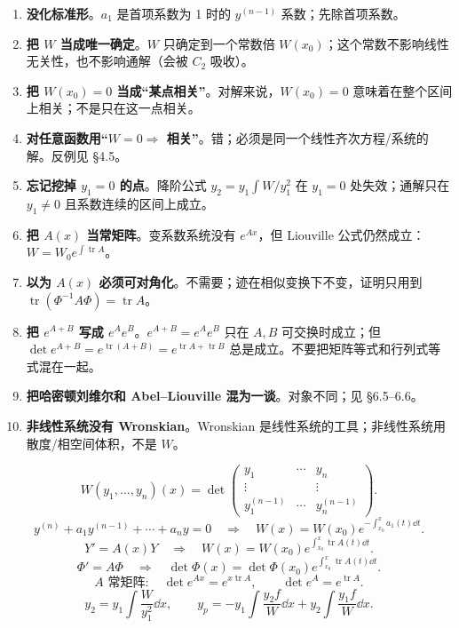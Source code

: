 \documentclass[11pt]{ctexart}
\let\orighdr\hdr
\renewcommand{\hdr}[2]{\needspace{12\baselineskip}\orighdr{#1}{#2}}
\let\origsubhdr\subhdr
\renewcommand{\subhdr}[1]{\needspace{3\baselineskip}\origsubhdr{#1}}
\newcommand{\tr}{\operatorname{tr}}
\begin{document}
\begin{enumerate}
  \item \textbf{没化标准形}。$a_1$ 是首项系数为 1 时的 $y^{(n-1)}$ 系数；先除首项系数。
  \item \textbf{把 $W$ 当成唯一确定}。$W$ 只确定到一个常数倍 $W(x_0)$；这个常数不影响线性无关性，也不影响通解（会被 $C_2$ 吸收）。
  \item \textbf{把 $W(x_0)=0$ 当成“某点相关”}。对解来说，$W(x_0)=0$ 意味着在整个区间上相关；不是只在这一点相关。
  \item \textbf{对任意函数用“$W=0\Rightarrow$ 相关”}。错；必须是同一个线性齐次方程/系统的解。反例见 §4.5。
  \item \textbf{忘记挖掉 $y_1=0$ 的点}。降阶公式 $y_2=y_1\int W/y_1^2$ 在 $y_1=0$ 处失效；通解只在 $y_1\neq0$ 且系数连续的区间上成立。
  \item \textbf{把 $A(x)$ 当常矩阵}。变系数系统没有 $e^{Ax}$，但 Liouville 公式仍然成立：$W=W_0e^{\int\tr A}$。
  \item \textbf{以为 $A(x)$ 必须可对角化}。不需要；迹在相似变换下不变，证明只用到 $\tr(\Phi^{-1}A\Phi)=\tr A$。
  \item \textbf{把 $e^{A+B}$ 写成 $e^A e^B$}。$e^{A+B}=e^A e^B$ 只在 $A,B$ 可交换时成立；但 $\det e^{A+B}=e^{\tr(A+B)}=e^{\tr A+\tr B}$ 总是成立。不要把矩阵等式和行列式等式混在一起。
  \item \textbf{把哈密顿刘维尔和 Abel--Liouville 混为一谈}。对象不同；见 §6.5--6.6。
  \item \textbf{非线性系统没有 Wronskian}。Wronskian 是线性系统的工具；非线性系统用散度/相空间体积，不是 $W$。
\end{enumerate}



\[
W(y_1,\dots,y_n)(x)=
\det\begin{pmatrix}
y_1&\cdots&y_n\\
\vdots&&\vdots\\
y_1^{(n-1)}&\cdots&y_n^{(n-1)}
\end{pmatrix}.
\]
\[
y^{(n)}+a_1y^{(n-1)}+\cdots+a_ny=0
\quad\Longrightarrow\quad
W(x)=W(x_0)e^{-\int_{x_0}^{x}a_1(t)\dd t}.
\]
\[
Y'=A(x)Y
\quad\Longrightarrow\quad
W(x)=W(x_0)e^{\int_{x_0}^{x}\tr A(t)\dd t}.
\]
\[
\Phi'=A\Phi
\quad\Longrightarrow\quad
\det\Phi(x)=\det\Phi(x_0)e^{\int_{x_0}^{x}\tr A(t)\dd t}.
\]
\[
A\text{ 常矩阵}:\quad
\det e^{Ax}=e^{x\tr A},\qquad
\det e^{A}=e^{\tr A}.
\]
\[
y_2=y_1\int\frac{W}{y_1^2}\dd x,
\qquad
y_p=-y_1\int\frac{y_2f}{W}\dd x
+y_2\int\frac{y_1f}{W}\dd x.
\]
\end{document}
